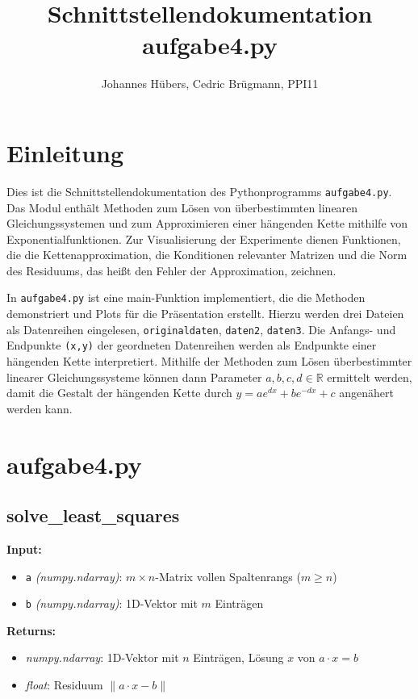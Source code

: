 \documentclass[a4paper, 11pt]{scrartcl}
\title{Schnittstellendokumentation aufgabe4.py}
\author{Johannes Hübers, Cedric Brügmann, PPI11}
\begin{document}
\maketitle

\section{Einleitung}
Dies ist die Schnittstellendokumentation des Pythonprogramms \texttt{aufgabe4.py}. Das Modul enthält Methoden zum Lösen von überbestimmten linearen Gleichungssystemen und zum Approximieren einer hängenden Kette mithilfe von Exponentialfunktionen. Zur Visualisierung der Experimente dienen Funktionen, die die Kettenapproximation, die Konditionen relevanter Matrizen und die Norm des Residuums, das heißt den Fehler der Approximation, zeichnen.

In \texttt{aufgabe4.py} ist eine main-Funktion implementiert, die die Methoden demonstriert und Plots für die Präsentation erstellt. Hierzu werden drei Dateien als Datenreihen eingelesen, \texttt{originaldaten}, \texttt{daten2}, \texttt{daten3}. Die Anfangs- und Endpunkte \texttt{(x,y)} der geordneten Datenreihen werden als Endpunkte einer hängenden Kette interpretiert. Mithilfe der Methoden zum Lösen überbestimmter linearer Gleichungssysteme können dann Parameter $a,b,c,d \in \mathbb{R}$ ermittelt werden, damit die Gestalt der hängenden Kette durch
$y = ae^{dx} + be^{-dx} + c$ angenähert werden kann.

\section{aufgabe4.py}
\subsection{solve\_least\_squares}

\textbf{Input:}
\begin{itemize}
    \item \texttt{a} \textit{(numpy.ndarray)}:
    $m \times n$-Matrix vollen Spaltenrangs ($m \geq n$)
\item \texttt{b} \textit{(numpy.ndarray)}:
    1D-Vektor mit $m$ Einträgen
\end{itemize} 

\noindent \textbf{Returns:}
\begin{itemize}
    \item \textit{numpy.ndarray}: 1D-Vektor mit $n$ Einträgen, Lösung $x$ von $a \cdot x = b$
    \item \textit{float}: Residuum $\| a \cdot x - b \|$
\end{itemize}
\end{document}
